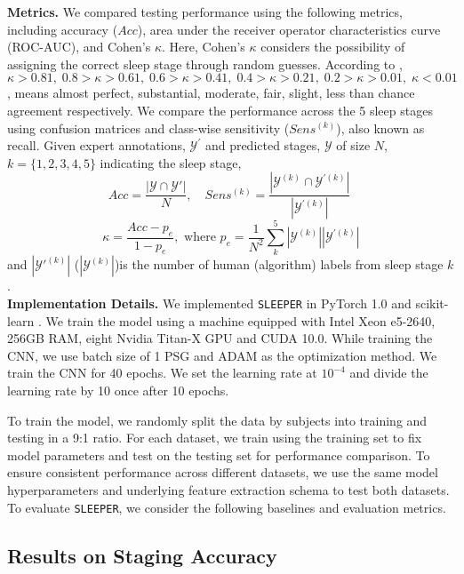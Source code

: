 \documentclass[pmlr]{jmlr}
\newcommand{\mname}
{\texttt{SLEEPER}\xspace}
\begin{document}
\noindent\textbf{Metrics.} We compared testing performance using the following metrics, including accuracy ($Acc$), area under the receiver operator characteristics curve (ROC-AUC), and Cohen's $\kappa$. Here, Cohen's $\kappa$ considers the possibility of assigning the correct sleep stage through random guesses. According to \citep{kappa_meaning}, $\kappa > 0.81, \;  0.8 >\kappa > 0.61, \; 0.6 >\kappa >0.41, \; 0.4 >\kappa >0.21, \; 0.2 >\kappa>0.01, \; \kappa <0.01$, means almost perfect, substantial, moderate, fair, slight, less than chance agreement respectively.  We compare the performance across the 5 sleep stages using confusion matrices and class-wise sensitivity ($Sens^{(k)}$), also known as recall. Given expert annotations, $\mathcal{Y}^\prime$ and predicted stages, $\mathcal{Y}$ of size $N$, $k=\{1,2,3,4,5\}$ indicating the sleep stage,
$$Acc = \frac{|\mathcal{Y}\cap \mathcal{Y}'|}{N}, \quad Sens^{(k)} = \frac{ \left| \mathcal{Y}^{(k)} \cap \mathcal{Y}^{\prime (k)} \right|}{\left|\mathcal{Y}^{\prime(k)}\right|} \; $$
$$\kappa = \frac{Acc - p_e}{1-p_e}, \text{ where } p_e = \frac{1}{N^2}\sum_k^5 \left|\mathcal{Y}^{(k)}\right| \left|\mathcal{Y}^{\prime(k)}\right| $$ and $|\mathcal{Y'}^{(k)}|$ ($|\mathcal{Y}^{(k)}|$)is the number of human (algorithm) labels from sleep stage $k$.
\\
 
 
\noindent\textbf{Implementation Details.} We implemented \mname in PyTorch 1.0 \citep{paszke2017automatic} and scikit-learn \citep{scikit-learn}. We train the model using a machine equipped with Intel Xeon e5-2640, 256GB RAM, eight Nvidia Titan-X GPU and CUDA 10.0. While training the CNN, we use batch size of 1 PSG and ADAM as the optimization method.  We train the CNN for 40 epochs. We set the learning rate at $10^{-4}$ and divide the learning rate by 10 once after 10 epochs.

To train the model, we randomly split the data by subjects into training and testing in a 9:1 ratio. For each dataset, we train using the training set to fix model parameters and test on the testing set for performance comparison. To ensure consistent performance across different datasets, we use the same model hyperparameters and underlying feature extraction schema to test both datasets. To evaluate \mname, we consider the following baselines and evaluation metrics.\\
\subsection{Results on Staging Accuracy} 
\end{document}
